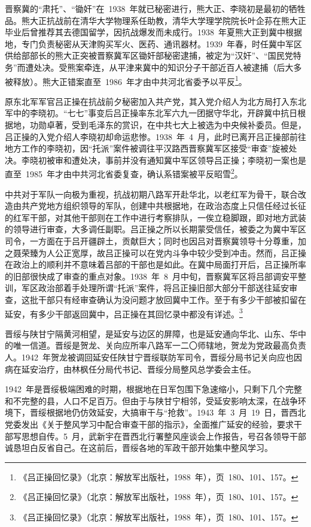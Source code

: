 晋察冀的“肃托”、“锄奸”在~1938~年就已秘密进行，熊大正、李晓初是最初的牺牲品。熊大正抗战前在清华大学物理系任助教，清华大学理学院院长叶企荪在熊大正毕业后曾推荐其去德国留学，因抗战爆发而未成行。1938~年夏熊大正到冀中根据地，专门负责秘密从天津购买军火、医药、通讯器材。1939~年春，时任冀中军区供给部部长的熊大正突被晋察冀军区锄奸部秘密逮捕，被定为“汉奸”、“国民党特务”而遭处决。受熊案牵连，从平津来冀中的知识分子干部近百人被逮捕（后大多被释放）。熊大正错案直至~1986~年才由中共河北省委予以平反\footnote{《吕正操回忆录》（北京：解放军出版社，1988~年），页~180、101、157。}。

原东北军军官吕正操在抗战前夕秘密加入共产党，其入党介绍人为北方局打入东北军中的李晓初。“七七”事变后吕正操率东北军六九一团据守华北，开辟冀中抗日根据地，功勋卓著，受到毛泽东的赏识，在中共七大上被选为中央候补委员。但是，吕正操的入党介绍人李晓初却命运悲惨。1938~年~4~月，此时已离开吕正操部前往地方工作的李晓初，因“托派”案件被调往平汉路西晋察冀军区接受“审查”旋被处决。李晓初被审和遭处决，事前并没有通知冀中军区领导吕正操；李晓初一案也是直至~1985~年才由中共河北省委复查，确认系错案被平反昭雪\footnote{《吕正操回忆录》（北京：解放军出版社，1988~年），页~180、101、157。}。

中共对于军队一向极为重视，抗战初期八路军开赴华北，以老红军为骨干，联合改造由共产党地方组织领导的军队，创建中共根据地，在政治态度上只信任经过长征的红军干部，对其他干部则在工作中进行考察排队，一俟立稳脚跟，即对地方武装的领导进行审查，大多调任副职。吕正操之所以长期蒙受信任，被委之为冀中军区司令，一方面在于吕开疆辟土，贡献巨大；同时也因吕对晋察冀领导十分尊重，加之聂荣臻为人公正宽厚，故吕正操可以在党内斗争中较少受到冲击。然而，吕正操在政治上的顺利并不意味着吕部的干部也是如此。在冀中局面打开后，吕正操所率的旧部很快成了审查的重点对象。1938~年~8~月中旬，晋察冀军区将吕部调安平整训，军区政治部着手处理所谓“托派”案件，将吕正操旧部大部分干部送往延安审查，这批干部只有经审查确认为没问题才放回冀中工作。至于有多少干部被扣留在延安，有多少干部返回冀中，吕正操在其回忆录中都没有详述。\footnote{《吕正操回忆录》（北京：解放军出版社，1988~年），页~180、101、157。}

晋绥与陕甘宁隔黄河相望，是延安与边区的屏障，也是延安通向华北、山东、华中的唯一信道。晋绥是贺龙、关向应所率八路军一二〇师辖地，贺龙为党政最高负责人。1942~年贺龙被调回延安任陕甘宁晋绥联防军司令，晋绥分局书记关向应也因病在延安治疗，由林枫任分局代书记、晋绥分局整风总学委会主任。

1942~年是晋绥极端困难的时期，根据地在日军包围下急速缩小，只剩下几个完整和不完整的县，人口不足百万。但由于与陕甘宁相邻，受延安影响太深，在战争环境下，晋绥根据地仍仿效延安，大搞审干与“抢救”。1943~年~3~月~19~日，晋西北党委发出《关于整风学习中配合审查干部的指示》，全面推广延安的经验，要求干部写思想自传。5~月，武新宇在晋西北行署整风座谈会上作报告，号召各领导干部诚恳坦白反省自己。在这前后，晋绥各地的军政干部开始集中整风学习。

